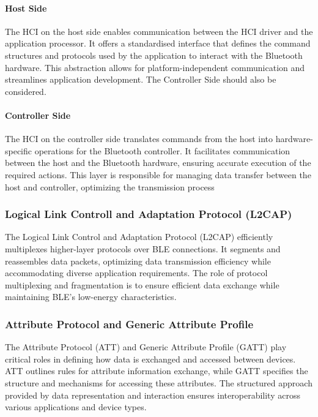 \paragraph{Host Side}
The HCI on the host side enables communication between the HCI driver and the application processor. It offers a standardised interface that defines the command structures and protocols used by the application to interact with the Bluetooth hardware. This abstraction allows for platform-independent communication and streamlines application development.
The Controller Side should also be considered.

\paragraph{Controller Side}
The HCI on the controller side translates commands from the host into hardware-specific operations for the Bluetooth controller. It facilitates communication between the host and the Bluetooth hardware, ensuring accurate execution of the required actions. This layer is responsible for managing data transfer between the host and controller, optimizing the transmission process


\subsubsection{Logical Link Controll and Adaptation Protocol (L2CAP)}
The Logical Link Control and Adaptation Protocol (L2CAP) efficiently multiplexes higher-layer protocols over BLE connections. It segments and reassembles data packets, optimizing data transmission efficiency while accommodating diverse application requirements. The role of protocol multiplexing and fragmentation is to ensure efficient data exchange while maintaining BLE's low-energy characteristics.

\subsubsection{Attribute Protocol and Generic Attribute Profile}
The Attribute Protocol (ATT) and Generic Attribute Profile (GATT) play critical roles in defining how data is exchanged and accessed between devices. ATT outlines rules for attribute information exchange, while GATT specifies the structure and mechanisms for accessing these attributes. The structured approach provided by data representation and interaction ensures interoperability across various applications and device types.

